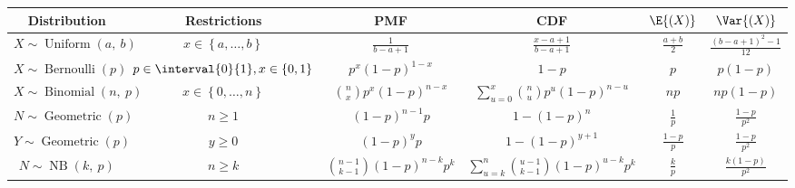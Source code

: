\documentclass{article}
\begin{document}
\begin{table}[H]
    \centering
    \begin{tabular}{c c c c c c}
        \toprule
        \textbf{Distribution}                                      & \textbf{Restrictions}                                  & \textbf{PMF}                                              & \textbf{CDF}                                                             & \(\E{\left( X \right)}\)            & \(\Var{\left( X \right)}\)                    \\
        \midrule
        \(X \sim \operatorname{Uniform}{\left( a,\: b \right)}\)   & \(x \in \left\{ a, \dots, b \right\}\)                 & \(\frac{1}{b - a + 1}\)                                   & \(\frac{x - a + 1}{b - a + 1}\)                                          & \(\frac{a + b}{2}\)                 & \(\frac{\left( b - a + 1 \right)^2 - 1}{12}\) \\
        \(X \sim \operatorname{Bernoulli}{\left( p \right)}\)      & \(p \in \interval{0}{1}, x \in \left\{ 0, 1 \right\}\) & \(p^x \left( 1 - p \right)^{1 - x}\)                      & \(1 - p\)                                                                & \(p\)                               & \(p \left( 1 - p \right)\)                    \\
        \(X \sim \operatorname{Binomial}{\left( n,\: p \right)}\)  & \(x \in \left\{ 0, \dots, n \right\}\)                 & \(\binom{n}{x} p^x \left( 1 - p \right)^{n - x}\)         & \(\sum_{u = 0}^x \binom{n}{u} p^u \left( 1 - p \right)^{n - u}\)         & \(np\)                              & \(np\left( 1 - p \right)\)                    \\
        \(N \sim \operatorname{Geometric}{\left( p \right)}\)      & \(n \geq 1\)                                           & \(\left( 1 - p \right)^{n - 1} p\)                        & \(1 - \left( 1 - p \right)^n\)                                           & \(\frac{1}{p}\)                     & \(\frac{1 - p}{p^2}\)                         \\
        \( Y \sim \operatorname{Geometric}{\left( p \right)}\)     & \(y \geq 0\)                                           & \(\left( 1 - p \right)^y p\)                              & \(1 - \left( 1 - p \right)^{y + 1}\)                                     & \(\frac{1 - p}{p}\)                 & \(\frac{1 - p}{p^2}\)                         \\
        \( N \sim \operatorname{NB}{\left( k,\: p \right)}\)       & \(n \geq k\)                                           & \(\binom{n - 1}{k - 1} \left( 1 - p \right)^{n - k} p^k\) & \(\sum_{u = k}^n \binom{u - 1}{k - 1} \left( 1 - p \right)^{u - k} p^k\) & \(\frac{k}{p}\)                     & \(\frac{k\left( 1 - p \right)}{p^2}\)         \\

\end{tabular}
\end{table}
\end{document}
